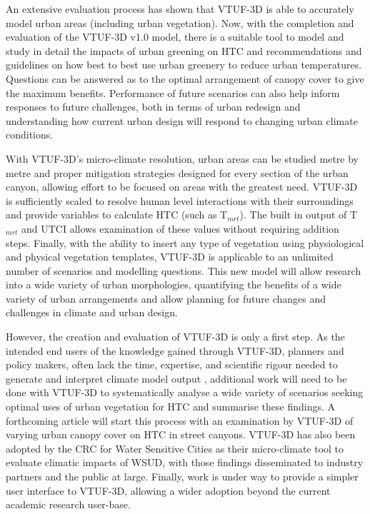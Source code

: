 \documentclass[final,3p,times,authoryear]{elsarticle}
\begin{document}
An extensive evaluation process has shown that VTUF-3D is able to accurately model urban areas (including urban vegetation). Now, with the completion and evaluation of the VTUF-3D v1.0 model, there is a suitable tool to model and study in detail the impacts of urban greening on HTC and recommendations and guidelines on how best to best use urban greenery to reduce urban temperatures. Questions can be answered as to the optimal arrangement of canopy cover to give the maximum benefits. Performance of future scenarios can also help inform responses to future challenges, both in terms of urban redesign and understanding how current urban design will respond to changing urban climate conditions.

With VTUF-3D's micro-climate resolution, urban areas can be studied metre by metre and proper mitigation strategies designed for every section of the urban canyon, allowing effort to be focused on areas with the greatest need. VTUF-3D is sufficiently scaled to resolve human level interactions with their surroundings and provide variables to calculate HTC (such as T$_{mrt}$). The built in output of T$_{mrt}$ and UTCI allows examination of these values without requiring addition steps. Finally, with the ability to insert any type of vegetation using physiological and physical vegetation templates, VTUF-3D is applicable to an unlimited number of scenarios and modelling questions. This new model will allow research into a wide variety of urban morphologies, quantifying the benefits of a wide variety of urban arrangements and allow planning for future changes and challenges in climate and urban design.

However, the creation and evaluation of VTUF-3D is only a first step. As the intended end users of the knowledge gained through VTUF-3D, planners and policy makers, often lack the time, expertise, and scientific rigour needed to generate and interpret climate model output \citep{Elasson2000,Moser2014,Winkler2011}, additional work will need to be done with VTUF-3D to systematically analyse a wide variety of scenarios seeking optimal uses of urban vegetation for HTC and summarise these findings. A forthcoming article will start this process with an examination by VTUF-3D of varying urban canopy cover on HTC in street canyons. VTUF-3D has also been adopted by the CRC for Water Sensitive Cities as their micro-climate tool to evaluate climatic impacts of WSUD, with those findings disseminated to industry partners and the public at large. Finally, work is under way to provide a simpler user interface to VTUF-3D, allowing a wider adoption beyond the current academic research user-base.
\end{document}

